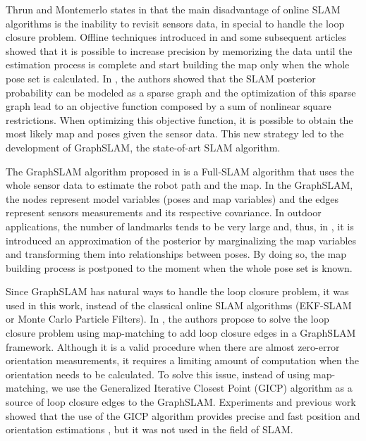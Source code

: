 Thrun and Montemerlo states in \cite{10thrun2006graph} that the main disadvantage of online SLAM algorithms is the inability to revisit sensors data, in special to handle the loop closure problem. Offline techniques introduced in \cite{43lu1997globally} and some subsequent articles \cite{12duckett2000learning,44golfarelli1998elastic,45frese2001simultaneous,46konolige2004large} showed that it is possible to increase precision by memorizing the data until the estimation process is complete and start building the map only when the whole pose set is calculated. In \cite{44golfarelli1998elastic}, the authors showed that the SLAM posterior probability can be modeled as a sparse graph and the optimization of this sparse graph lead to an objective function composed by a sum of nonlinear square restrictions. When optimizing this objective function, it is possible to obtain the most likely map and poses given the sensor data. This new strategy led to the development of GraphSLAM, the state-of-art SLAM algorithm.

The GraphSLAM algorithm proposed in \cite{10thrun2006graph} is a Full-SLAM algorithm that uses the whole sensor data to estimate the robot path and the map. In the GraphSLAM, the nodes represent model variables (poses and map variables) and the edges represent sensors measurements and its respective covariance. In outdoor applications, the number of landmarks tends to be very large and, thus, in \cite{10thrun2006graph},  it is introduced an approximation of the posterior by marginalizing the map variables and transforming them into relationships between poses. By doing so, the map building process is postponed to the moment when the whole pose set is known.

Since GraphSLAM has natural ways to handle the loop closure problem, it was used in this work, instead of the classical online SLAM algorithms (EKF-SLAM or Monte Carlo Particle Filters). In \cite{13levinson2007map}, the authors propose to solve the loop closure problem using map-matching to add loop closure edges in a GraphSLAM framework. Although it is a valid procedure when there are almost zero-error orientation measurements, it requires a limiting amount of computation when the orientation needs to be calculated. To solve this issue, instead of using map-matching, we use the Generalized Iterative Closest Point (GICP) \cite{58segal2009generalized} algorithm as a source of loop closure edges to the GraphSLAM. Experiments and previous work showed that the use of the GICP algorithm provides precise and fast position and orientation estimations \cite{48levinson2010robust}, but it was not used in the field of SLAM.

